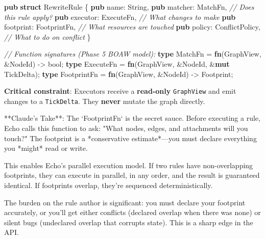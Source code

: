 \documentclass[
  11pt,
]{book}
\newenvironment{Shaded}{}{}
\newcommand{\CommentTok}[1]{\textcolor[rgb]{0.38,0.63,0.69}{\textit{#1}}}
\newcommand{\DataTypeTok}[1]{\textcolor[rgb]{0.56,0.13,0.00}{#1}}
\newcommand{\KeywordTok}[1]{\textcolor[rgb]{0.00,0.44,0.13}{\textbf{#1}}}
\newcommand{\NormalTok}[1]{#1}
\newcommand{\OperatorTok}[1]{\textcolor[rgb]{0.40,0.40,0.40}{#1}}
\newcounter{none} %
\begin{document}
\begin{Shaded}
\begin{Highlighting}[]
\KeywordTok{pub} \KeywordTok{struct}\NormalTok{ RewriteRule }\OperatorTok{\{}
    \KeywordTok{pub}\NormalTok{ name}\OperatorTok{:} \DataTypeTok{String}\OperatorTok{,}
    \KeywordTok{pub}\NormalTok{ matcher}\OperatorTok{:}\NormalTok{ MatchFn}\OperatorTok{,}      \CommentTok{// Does this rule apply?}
    \KeywordTok{pub}\NormalTok{ executor}\OperatorTok{:}\NormalTok{ ExecuteFn}\OperatorTok{,}    \CommentTok{// What changes to make}
    \KeywordTok{pub}\NormalTok{ footprint}\OperatorTok{:}\NormalTok{ FootprintFn}\OperatorTok{,} \CommentTok{// What resources are touched}
    \KeywordTok{pub}\NormalTok{ policy}\OperatorTok{:}\NormalTok{ ConflictPolicy}\OperatorTok{,} \CommentTok{// What to do on conflict}
\OperatorTok{\}}

\CommentTok{// Function signatures (Phase 5 BOAW model):}
\KeywordTok{type}\NormalTok{ MatchFn    }\OperatorTok{=} \KeywordTok{fn}\NormalTok{(GraphView}\OperatorTok{,} \OperatorTok{\&}\NormalTok{NodeId) }\OperatorTok{{-}\textgreater{}} \DataTypeTok{bool}\OperatorTok{;}
\KeywordTok{type}\NormalTok{ ExecuteFn  }\OperatorTok{=} \KeywordTok{fn}\NormalTok{(GraphView}\OperatorTok{,} \OperatorTok{\&}\NormalTok{NodeId}\OperatorTok{,} \OperatorTok{\&}\KeywordTok{mut}\NormalTok{ TickDelta)}\OperatorTok{;}
\KeywordTok{type}\NormalTok{ FootprintFn }\OperatorTok{=} \KeywordTok{fn}\NormalTok{(GraphView}\OperatorTok{,} \OperatorTok{\&}\NormalTok{NodeId) }\OperatorTok{{-}\textgreater{}}\NormalTok{ Footprint}\OperatorTok{;}
\end{Highlighting}
\end{Shaded}

\textbf{Critical constraint}: Executors receive a \textbf{read-only}
\texttt{GraphView} and emit changes to a \texttt{TickDelta}. They
\textbf{never} mutate the graph directly.

\begin{claudecommentary}
**Claude's Take**: The `FootprintFn` is the secret sauce. Before executing a rule, Echo calls this function to ask: "What nodes, edges, and attachments will you touch?" The footprint is a *conservative estimate*—you must declare everything you *might* read or write.

This enables Echo's parallel execution model. If two rules have non-overlapping footprints, they can execute in parallel, in any order, and the result is guaranteed identical. If footprints overlap, they're sequenced deterministically.

The burden on the rule author is significant: you must declare your footprint accurately, or you'll get either conflicts (declared overlap when there was none) or silent bugs (undeclared overlap that corrupts state). This is a sharp edge in the API.
\end{claudecommentary}
\end{document}
